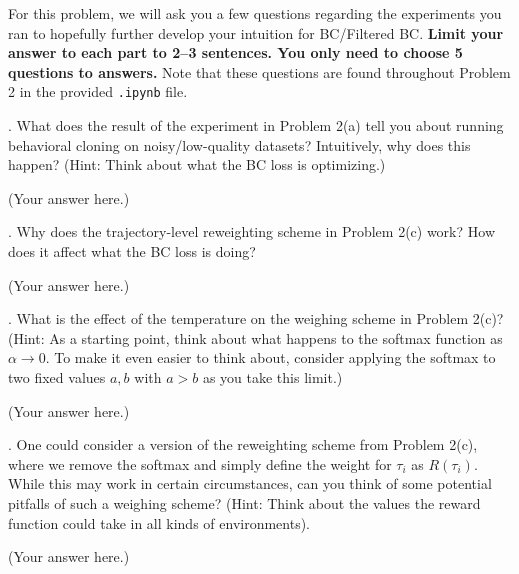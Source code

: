 \documentclass{article}
\begin{document}
        For this problem, we will ask you a few questions regarding the experiments you ran to hopefully further develop your intuition for BC/Filtered BC.
        \textbf{Limit your answer to each part to 2--3 sentences. You only need to choose 5 questions to answers.}
        Note that these questions are found throughout Problem 2 in the provided \verb+.ipynb+ file.

        \vspace{1ex}
        
        . What does the result of the experiment in Problem 2(a) tell you about running behavioral cloning on noisy/low-quality datasets? Intuitively, why does this happen? \newline 
        (Hint: Think about what the BC loss is optimizing.)
        \begin{solution}
            (Your answer here.)
        \end{solution}

        . Why does the trajectory-level reweighting scheme in Problem 2(c) work? How does it affect what the BC loss is doing?
        \begin{solution}
            (Your answer here.)
        \end{solution}

        . What is the effect of the temperature on the weighing scheme in Problem 2(c)? \newline
        (Hint: As a starting point, think about what happens to the softmax function as $\alpha \to 0$. To make it even easier to think about, consider applying the softmax to two fixed values $a, b$ with $a > b$ as you take this limit.)
        \begin{solution}
            (Your answer here.)
        \end{solution}

        . One could consider a version of the reweighting scheme from Problem 2(c), where we remove the softmax and simply define the weight for $\tau_i$ as $R(\tau_i)$. While this may work in certain circumstances, can you think of some potential pitfalls of such a weighing scheme? \newline
        (Hint: Think about the values the reward function could take in all kinds of environments).
        \begin{solution}
            (Your answer here.)
        \end{solution}
\end{document}
